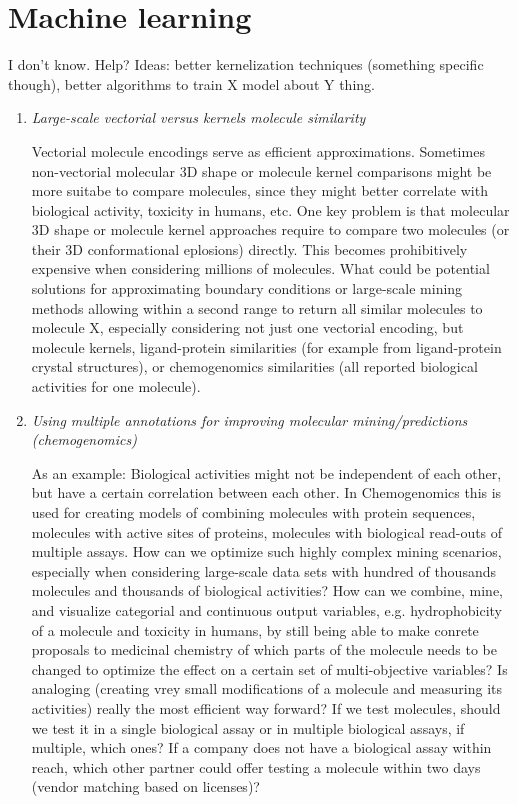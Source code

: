 \documentclass{sig-alternate}
\begin{document}
\section*{Machine learning}
I don't know.  Help?  Ideas: better kernelization techniques (something specific though), better algorithms to train X model about Y thing.
\begin{enumerate}
\item \emph{Large-scale vectorial versus kernels molecule similarity}

Vectorial molecule encodings serve as efficient approximations.
Sometimes non-vectorial molecular 3D shape or molecule kernel comparisons might be more suitabe to compare molecules, since
they might better correlate with biological activity, toxicity in humans, etc. One key problem is that molecular 3D shape 
or molecule kernel approaches require to compare two molecules (or their 3D conformational eplosions) directly.
This becomes prohibitively expensive when considering millions of molecules. What could be potential solutions for approximating boundary 
conditions or large-scale mining methods allowing within a second range to return all similar molecules to molecule X, especially
considering not just one vectorial encoding, but molecule kernels, ligand-protein similarities (for example from ligand-protein crystal structures), 
or chemogenomics similarities (all reported biological activities for one molecule).
%
\item \emph{Using multiple annotations for improving molecular mining/predictions (chemogenomics)}

As an example: Biological activities might not be independent of each other, but have a certain correlation between each other.
In Chemogenomics this is used for creating models of combining molecules with protein sequences, molecules with active sites of proteins,
molecules with biological read-outs of multiple assays. How can we optimize such highly complex mining scenarios, especially
when considering large-scale data sets with hundred of thousands molecules and thousands of biological activities? 
How can we combine, mine, and visualize categorial and continuous output variables, e.g. hydrophobicity of a molecule and toxicity in humans, 
by still being able to make conrete proposals to medicinal chemistry of which parts of the molecule needs to be changed to
optimize the effect on a certain set of multi-objective variables? Is analoging (creating vrey small modifications of a molecule and measuring its activities)
really the most efficient way forward? If we test molecules, should we test it in a single biological assay or in multiple biological assays, if multiple, which ones?
If a company does not have a biological assay within reach, which other partner could offer testing a molecule within two days (vendor matching based on licenses)?
\end{enumerate} 
\end{document}
